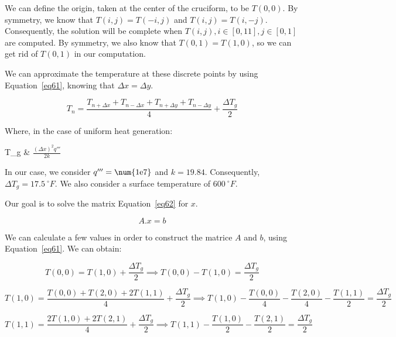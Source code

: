 We can define the origin, taken at the center of the cruciform, to be $T(0,0)$. By symmetry, we know that $T(i,j) = T(-i,j)$ and $T(i,j) = T(i,-j)$. Consequently, the solution will be complete when $T(i,j), i \in [0, 11], j \in [0,1]$ are computed. By symmetry, we also know that $T(0,1) = T(1,0)$, so we can get rid of $T(0,1)$ in our computation.

We can approximate the temperature at these discrete points by using Equation~\ref{eq61}, knowing that $\Delta x = \Delta y$.

\begin{equation}\label{eq61}
T_n = \frac{T_{n+\Delta x} + T_{n-\Delta x} + T_{n+\Delta y} + T_{n-\Delta y}}{4} + \frac{\Delta T_g}{2}
\end{equation}

Where, in the case of uniform heat generation:

\begin{conditions}
\Delta T_g & $\frac{(\Delta x)^2 q'''}{2k}$
\end{conditions}

In our case, we consider $q''' = \text{\num{1e7}}$ and $k = 19.84$. Consequently, $\Delta T_g = 17.5\ {}^\circ F$. We also consider a surface temperature of $600\ {}^\circ F$.

Our goal is to solve the matrix Equation~\ref{eq62} for $x$.

\begin{equation}\label{eq62}
A . x = b
\end{equation}

We can calculate a few values in order to construct the matrice $A$ and $b$, using Equation~\ref{eq61}. We can obtain:

\begin{equation}\label{eq63}
T(0,0) = T(1,0) + \frac{\Delta T_g}{2} \implies T(0,0) - T(1,0) = \frac{\Delta T_g}{2}
\end{equation}

\begin{equation}\label{eq64}
T(1,0) = \frac{T(0,0) + T(2,0) + 2T(1,1)}{4} + \frac{\Delta T_g}{2} \implies T(1,0) - \frac{T(0,0)}{4} - \frac{T(2,0)}{4} - \frac{T(1,1)}{2} = \frac{\Delta T_g}{2}
\end{equation}

\begin{equation}\label{eq65}
T(1,1) = \frac{2T(1,0) + 2T(2,1)}{4} + \frac{\Delta T_g}{2} \implies T(1,1) - \frac{T(1,0)}{2} - \frac{T(2,1)}{2} = \frac{\Delta T_g}{2}
\end{equation}

